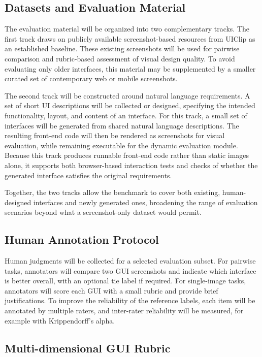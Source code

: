 \documentclass[pdflatex,sn-mathphys-num]{sn-jnl}
\begin{document}
\subsection{Datasets and Evaluation Material}

The evaluation material will be organized into two complementary tracks. The first
track draws on publicly available screenshot-based resources from UIClip as an
established baseline. These existing screenshots will be used for pairwise comparison
and rubric-based assessment of visual design quality. To avoid evaluating only older
interfaces, this material may be supplemented by a smaller curated set of contemporary
web or mobile screenshots.

The second track will be constructed around natural language requirements. A set of
short UI descriptions will be collected or designed, specifying the intended
functionality, layout, and content of an interface. For this track, a small set of
interfaces will be generated from shared natural language descriptions. The resulting
front-end code will then be rendered as screenshots for visual evaluation, while
remaining executable for the dynamic evaluation module. Because this track produces
runnable front-end code rather than static images alone, it supports both
browser-based interaction tests and checks of whether the generated interface
satisfies the original requirements.

Together, the two tracks allow the benchmark to cover both existing, human-designed
interfaces and newly generated ones, broadening the range of evaluation scenarios
beyond what a screenshot-only dataset would permit.

\subsection{Human Annotation Protocol}

Human judgments will be collected for a selected evaluation subset. For pairwise tasks,
annotators will compare two GUI screenshots and indicate which interface is better
overall, with an optional tie label if required. For single-image tasks, annotators
will score each GUI with a small rubric and provide brief justifications. To improve
the reliability of the reference labels, each item will be annotated by multiple
raters, and inter-rater reliability will be measured, for example with
Krippendorff's alpha.

\subsection{Multi-dimensional GUI Rubric}
\end{document}
